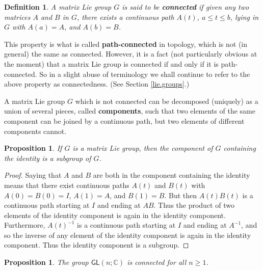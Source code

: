\documentclass{amsbook}
\theoremstyle{plain}
\newtheorem{definition}[theorem]{Definition}
\newtheorem{proposition}[theorem]{Proposition}
\numberwithin{equation}{chapter}
\numberwithin{theorem}{chapter}
\begin{document}
\begin{definition}
\label{connectedness}A matrix Lie group $G$ is said to be \textbf{connected}
if given any two matrices $A$ and $B$ in $G$, there exists a continuous path
$A(t)$, $a\leq t\leq b$, lying in $G$ with $A(a)=A$, and $A(b)=B$.
\end{definition}

This property is what is called \textbf{path-connected} in topology, which is
not (in general) the same as connected. However, it is a fact (not
particularly obvious at the moment) that a matrix Lie group is connected if
and only if it is path-connected. So in a slight abuse of terminology we shall
continue to refer to the above property as connectedness. (See Section
\ref{lie.groups}.)

A matrix Lie group $G$ which is not connected can be decomposed (uniquely) as
a union of several pieces, called \textbf{components}, such that two elements
of the same component can be joined by a continuous path, but two elements of
different components cannot.

\begin{proposition}
If $G$ is a matrix Lie group, then the component of $G$ containing the
identity is a subgroup of $G$.
\end{proposition}

\begin{proof}
Saying that $A$ and $B$ are both in the component containing the identity
means that there exist continuous paths $A(t)$ and $B(t)$ with $A(0)=B(0)=I$,
$A(1)=A$, and $B(1)=B$. But then $A(t)B(t)$ is a continuous path starting at
$I$ and ending at $AB$. Thus the product of two elements of the identity
component is again in the identity component. Furthermore, $A(t)^{-1}$ is a
continuous path starting at $I$ and ending at $A^{-1}$, and so the inverse of
any element of the identity component is again in the identity component. Thus
the identity component is a subgroup.
\end{proof}

\begin{proposition}
The group $\mathsf{GL}(n;\mathbb{C})$ is connected for all $n\geq1$.
\end{proposition}
\end{document}
